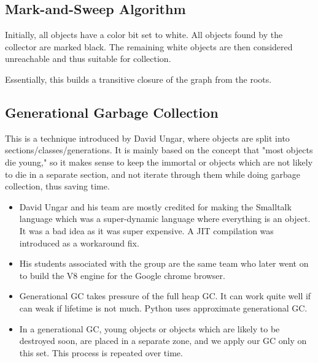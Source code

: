 \documentclass[twoside]{article}
\begin{document}
\subsection{Mark-and-Sweep Algorithm}

Initially, all objects have a color bit set to white. All objects found by the collector are marked black. The remaining white objects are then considered unreachable and thus suitable for collection.

Essentially, this builds a transitive closure of the graph from the roots.

\subsection{Generational Garbage Collection}

This is a technique introduced by David Ungar, where objects are split into sections/classes/generations. It is mainly based on the concept that "most objects die young," so it makes sense to keep the immortal or objects which are not likely to die in a separate section, and not iterate through them while doing garbage collection, thus saving time.

\begin{itemize}
	\itemsep 0cm
	\item David Ungar and his team are mostly credited for making the Smalltalk language which was a super-dynamic language where everything is an object. It was a bad idea as it was super expensive. A JIT compilation was introduced as a workaround fix.
	\item His students associated with the group are the same team who later went on to build the V8 engine for the Google chrome browser.
	\item Generational GC takes pressure of the full heap GC. It can work quite well if can weak if lifetime is not much. Python uses approximate generational GC.
	\item In a generational GC, young objects or objects which are likely to be destroyed soon, are placed in a separate zone, and we apply our GC only on this set. This process is repeated over time. 
\end{itemize}
\end{document}
